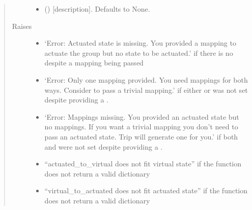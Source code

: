 \documentclass[letterpaper,10pt,english]{sphinxmanual}
\begin{document}
\begin{fulllineitems}
\begin{quote}
\begin{description}
\begin{itemize}
\item {} 
 (\sphinxstyleliteralemphasis{\sphinxupquote{{[}}}\sphinxstyleliteralemphasis{\sphinxupquote{{]}}}\sphinxstyleliteralemphasis{\sphinxupquote{, }}) \textendash{} {[}description{]}. Defaults to None.

\end{itemize}

\item[{Raises}] \leavevmode\begin{itemize}
\item {} 
 \textendash{} ‘Error: Actuated state is missing. You provided a mapping to actuate the group but no state to be actuated.’
    if there is no  despite a mapping being passed

\item {} 
 \textendash{} ‘Error: Only one mapping provided. You need mappings for both ways. Consider to pass a trivial mapping.’
    if either  or  was not set despite providing a .

\item {} 
 \textendash{} ‘Error: Mappings missing. You provided an actuated state but no mappings. If you want a trivial mapping you don’t need to pass an actuated state. Trip will generate one for you.’
    if both  and  were not set despite providing a .

\item {} 
 \textendash{} “actuated\_to\_virtual does not fit virtual state” if the  function does not return a valid  dictionary

\item {} 
 \textendash{} “virtual\_to\_actuated does not fit actuated state” if the  function does not return a valid  dictionary


\end{itemize}
\end{description}
\end{quote}
\end{fulllineitems}
\end{document}
